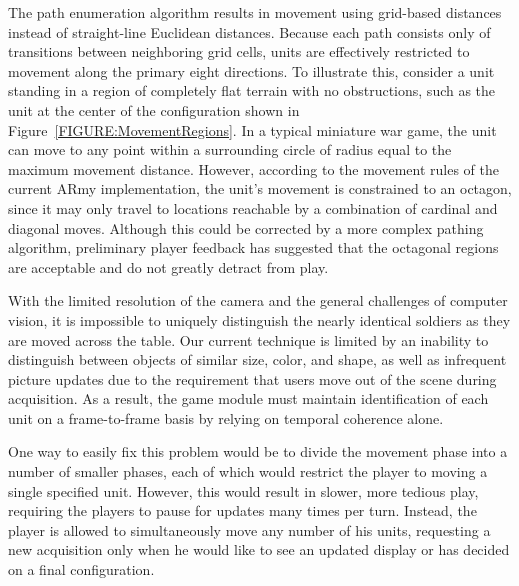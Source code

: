 \documentclass{thesis}
\begin{document}
The path enumeration algorithm results in movement using grid-based distances instead of straight-line Euclidean distances. Because each path consists only of transitions between neighboring grid cells, units are effectively restricted to movement along the primary eight directions. To illustrate this, consider a unit standing in a region of completely flat terrain with no obstructions, such as the unit at the center of the configuration shown in Figure~\ref{FIGURE:MovementRegions}. In a typical miniature war game, the unit can move to any point within a surrounding circle of radius equal to the maximum movement distance. However, according to the movement rules of the current ARmy implementation, the unit's movement is constrained to an octagon, since it may only travel to locations reachable by a combination of cardinal and diagonal moves. Although this could be corrected by a more complex pathing algorithm, preliminary player feedback has suggested that the octagonal regions are acceptable and do not greatly detract from play.


With the limited resolution of the camera and the general challenges of computer vision, it is impossible to uniquely distinguish the nearly identical soldiers as they are moved across the table. Our current technique is limited by an inability to distinguish between objects of similar size, color, and shape, as well as infrequent picture updates due to the requirement that users move out of the scene during acquisition. As a result, the game module must maintain identification of each unit on a frame-to-frame basis by relying on temporal coherence alone. 

One way to easily fix this problem would be to divide the movement phase into a number of smaller phases, each of which would restrict the player to moving a single specified unit. However, this would result in slower, more tedious play, requiring the players to pause for updates many times per turn. Instead, the player is allowed to simultaneously move any number of his units, requesting a new acquisition only when he would like to see an updated display or has decided on a final configuration.
\end{document}
